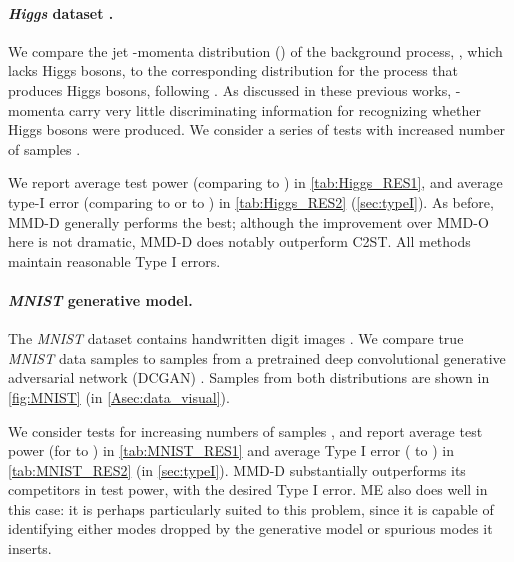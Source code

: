 \documentclass{article}
\begin{document}
\vspace{-1.5ex}\paragraph{\emph{Higgs} dataset \citep{Baldi_Higgs_datasets}.}
We compare the jet -momenta distribution () of the background process, , which lacks Higgs bosons,
to the corresponding distribution  for the process that produces Higgs bosons,
following \citet{Chwialkowski2015}.
As discussed in these previous works, -momenta carry very little discriminating information for recognizing whether Higgs bosons were produced.
We consider a series of tests with increased number of samples .

We report average test power (comparing  to ) in \cref{tab:Higgs_RES1},
and average type-I error (comparing  to  or  to ) in \cref{tab:Higgs_RES2} (\cref{sec:typeI}).
As before, MMD-D generally performs the best;
although the improvement over MMD-O here is not dramatic,
MMD-D does notably outperform C2ST.
All methods maintain reasonable Type I errors.


\vspace{-1.5ex}\paragraph{\emph{MNIST} generative model.}
The \emph{MNIST} dataset contains  handwritten digit images  \citep{lecun1998gradient}.
We compare true \emph{MNIST} data samples 
to samples  from a pretrained {deep convolutional generative adversarial network} (DCGAN) \citep{DCGAN_Radford}.
Samples from both distributions are shown in \cref{fig:MNIST} (in \cref{Asec:data_visual}).

We consider tests for increasing numbers of samples ,
and report average test power (for  to ) in \cref{tab:MNIST_RES1}
and average Type I error ( to ) in \cref{tab:MNIST_RES2} (in \cref{sec:typeI}).
MMD-D substantially outperforms its competitors in test power,
with the desired Type I error.
ME also does well in this case:
it is perhaps particularly suited to this problem,
since it is capable of identifying either modes dropped by the generative model or spurious modes it inserts.
\end{document}
